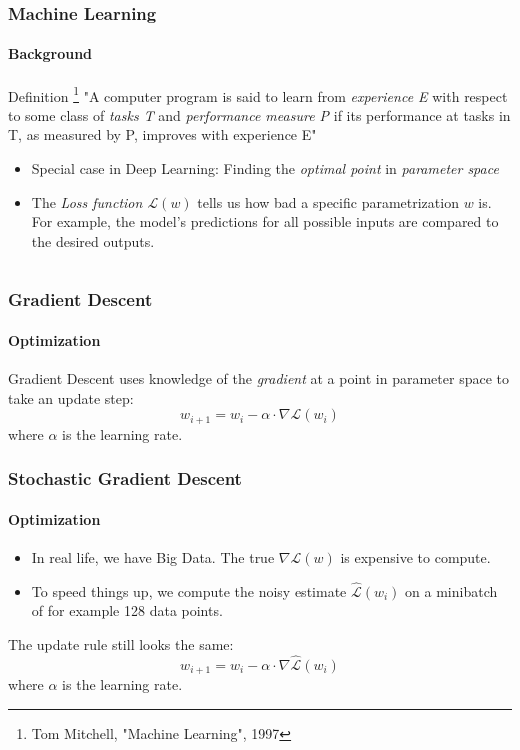 \documentclass[10pt,usepdftitle=false,aspectratio=169]{beamer}
\renewcommand{\L}{\mathcal{L}}
\begin{document}
\begin{frame}
\frametitle{Machine Learning}
\framesubtitle{Background}
	\begin{block}{Definition \footnote{Tom Mitchell, "Machine Learning", 1997}}
		"A computer program is said to learn from \emph{experience E} with respect to some class of \emph{tasks T} and \emph{performance measure P} if its performance at tasks in T, as measured by P, improves with experience E"
	\end{block}
	\begin{itemize}
		\item Special case in Deep Learning: Finding the \emph{optimal point} in \emph{parameter space}
		\item The \emph{Loss function $\L (w)$} tells us how bad a specific parametrization $w$ is. For example, the model's predictions for all possible inputs are compared to the desired outputs.
	\end{itemize}
\end{frame}

\begin{frame}[label=landscape]{}{ }
\begin{columns}
	\begin{column}{0.5 \linewidth}
		
	\end{column}
	\begin{column}{0.5 \linewidth}
		
	\end{column}
\end{columns}
\end{frame}



\begin{frame}
\frametitle{Gradient Descent}
\framesubtitle{Optimization}
	Gradient Descent uses knowledge of the \emph{gradient} at a point in parameter space to take an update step:
		$$ w_{i+1} = w_i - \alpha \cdot \nabla \L(w_i) $$
	where $\alpha$ is the learning rate.
	
\end{frame}


\begin{frame}
\frametitle{Stochastic Gradient Descent}
\framesubtitle{Optimization}
\begin{itemize}
	\item In real life, we have Big Data. The true $\nabla \L(w)$ is expensive to compute.
	\item To speed things up, we compute the noisy estimate $\hat{\L}(w_i)$ on a minibatch of for example 128 data points.
\end{itemize}
The update rule still looks the same:
$$w_{i+1} = w_i - \alpha \cdot \nabla \hat{\L}(w_i) $$
where $\alpha$ is the learning rate.

\end{frame}
\end{document}
